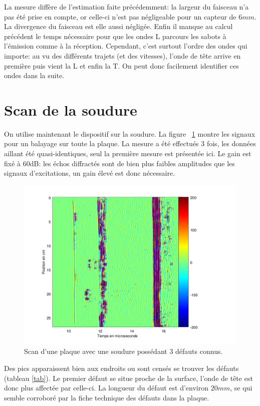 \documentclass[twoside]{article}
\begin{document}
\begin{multicols}{2}
La mesure diffère de l'estimation faite précédemment: la largeur du faisceau n'a pas été prise en compte, or celle-ci n'est pas négligeable pour un capteur de $6mm$. La divergence du faisceau est elle aussi négligée. Enfin il manque au calcul précédent le temps nécessaire pour que les ondes L parcours les sabots à l'émission comme à la réception. Cependant, c'est surtout l'ordre des ondes qui importe: au vu des différents trajets (et des vitesses), l'onde de tête arrive en première puis vient la L et enfin la T. On peut donc facilement identifier ces ondes dans la suite.



\section{Scan de la soudure}
On utilise maintenant le dispositif sur la soudure. La figure ~\ref{fig2} montre les signaux pour un balayage sur toute la plaque. La mesure a été effectués 3 fois, les données aillant été quasi-identiques, seul la première mesure est présentée ici. Le gain est fixé à 60dB: les échos diffractés sont de bien plus faibles amplitudes que les signaux d'excitations, un gain élevé est donc nécessaire.

\begin{figure}
\centering
\includegraphics[scale=0.5]{./images/bscan.png}
\caption{\label{fig2} Scan d'une plaque avec une soudure possédant 3 défauts connus.}
\end{figure}

Des pics apparaissent bien aux endroits ou sont censés se trouver les défauts (tableau \ref{tab}). 
Le premier défaut se situe proche de la surface, l'onde de tête est donc plus affectée par celle-ci. La longueur du défaut est d'environ $20 mm$, se qui semble corroboré par la fiche technique des défauts dans la plaque.


\end{multicols}
\end{document}
